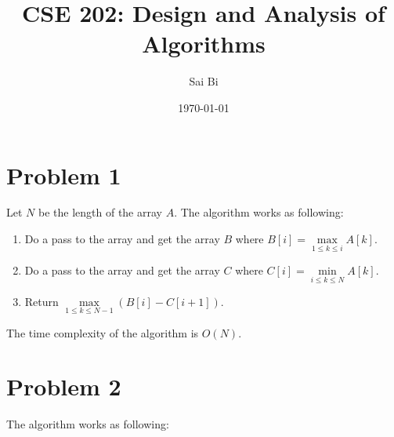 \documentclass[a4paper,11pt]{article}
\theoremstyle{mytheor}
\begin{document}
\title{CSE 202: Design and Analysis of Algorithms}

\author{Sai Bi}

\date{\today}

\maketitle

\section*{Problem 1}
Let $N$ be the length of the array $A$. The algorithm works as following:
\begin{enumerate}
\item
Do a pass to the array and get the array $B$ where $B[i]=\max\limits_{1\leq k \leq i} A[k]$.
\item 
Do a pass to the array and get the array $C$ where $C[i]=\min\limits_{i\leq k \leq N} A[k]$.
\item
Return $\max\limits_{1\leq k \leq N-1} (B[i] - C[i+1])$.
\end{enumerate}
The time complexity of the algorithm is $O(N)$.

\section*{Problem 2}
The algorithm works as following:
\end{document}
